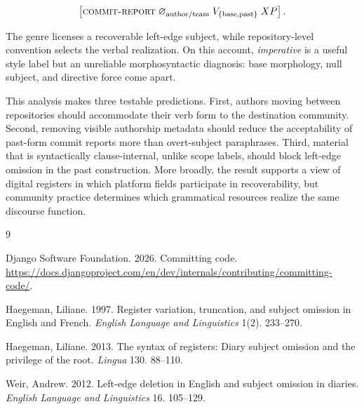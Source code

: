 \documentclass[12pt]{article}
\begin{document}
\[
\left[\textsc{commit-report}\;\varnothing_{\mathrm{author/team}}\;
V_{\{\mathrm{base},\mathrm{past}\}}\;XP\right].
\]

The genre licenses a recoverable left-edge subject, while repository-level
convention selects the verbal realization. On this account, \emph{imperative}
is a useful style label but an unreliable morphosyntactic diagnosis: base
morphology, null subject, and directive force come apart.

This analysis makes three testable predictions. First, authors moving between
repositories should accommodate their verb form to the destination community.
Second, removing visible authorship metadata should reduce the acceptability of
past-form commit reports more than overt-subject paraphrases. Third, material
that is syntactically clause-internal, unlike scope labels, should block
left-edge omission in the past construction. More broadly, the result supports
a view of digital registers in which platform fields participate in
recoverability, but community practice determines which grammatical resources
realize the same discourse function.

\vspace{-0.35em}
\begin{thebibliography}{9}
\setlength{\itemsep}{0pt}
\setlength{\parskip}{0pt}

Django Software Foundation. 2026.
\newblock Committing code.
\newblock \url{https://docs.djangoproject.com/en/dev/internals/contributing/committing-code/}.

Haegeman, Liliane. 1997.
\newblock Register variation, truncation, and subject omission in English and French.
\newblock \textit{English Language and Linguistics} 1(2). 233--270.

Haegeman, Liliane. 2013.
\newblock The syntax of registers: Diary subject omission and the privilege of the root.
\newblock \textit{Lingua} 130. 88--110.

Weir, Andrew. 2012.
\newblock Left-edge deletion in English and subject omission in diaries.
\newblock \textit{English Language and Linguistics} 16. 105--129.

\end{thebibliography}
\end{document}
